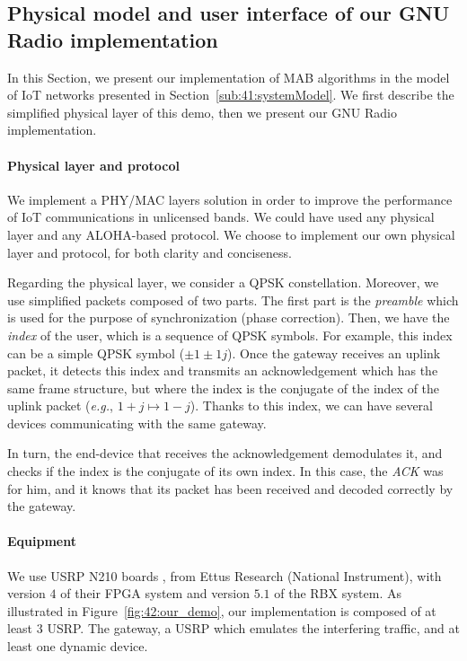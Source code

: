 \subsection{Physical model and user interface of our GNU Radio implementation}
\label{sub:42:implementation}

In this Section, we present our implementation of MAB algorithms in the model of IoT networks presented in Section~\ref{sub:41:systemModel}.
We first describe the simplified physical layer of this demo, then we present our GNU Radio implementation.


\paragraph{Physical layer and protocol}

We implement a PHY/MAC layers solution in order to improve the performance of IoT communications in unlicensed bands. We could have used any physical layer and any ALOHA-based protocol.
We choose to implement our own physical layer and protocol, for both clarity and conciseness.

Regarding the physical layer, we consider a QPSK constellation. Moreover, we use simplified packets composed of two parts.
The first part is the \emph{preamble} which is used for the purpose of synchronization (phase correction).
Then, we have the \emph{index} of the user, which is a sequence of QPSK symbols.
For example, this index can be a simple QPSK symbol ($\pm1\pm1j$).
Once the gateway receives an uplink packet, it detects this index and transmits an acknowledgement which has the same frame structure, but where the index is the conjugate of the index of the uplink packet (\emph{e.g.}, $1+j \mapsto 1-j$).
Thanks to this index, we can have several devices communicating with the same gateway.

In turn, the end-device that receives the acknowledgement demodulates it, and checks if the index is the conjugate of its own index.
In this case, the \emph{ACK} was for him, and it knows that its packet has been received and decoded correctly by the gateway.


\paragraph{Equipment}
We use USRP N210 boards \cite{USRPDocumentation}, from Ettus Research (National Instrument),
with version $4$ of their FPGA system and version $5.1$ of the RBX system.
As illustrated in Figure~\ref{fig:42:our_demo}, our implementation is composed of at least $3$ USRP.
The gateway, a USRP which emulates the interfering traffic, and at least one dynamic device.

